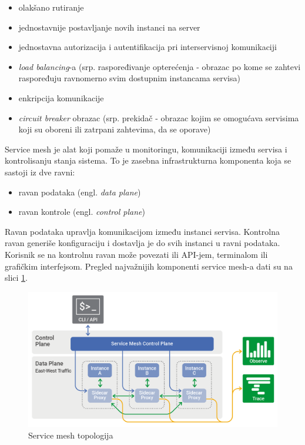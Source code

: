 \documentclass[a4paper,12pt]{report}
\begin{document}
\begin{itemize}
	\item olakšano rutiranje
	\item jednostavnije postavljanje novih instanci na server
	\item jednostavna autorizacija i autentifikacija pri interservisnoj komunikaciji
	\item \textit{load balancing}-a (srp. raspoređivanje opterećenja - obrazac po kome se zahtevi raspoređuju ravnomerno svim dostupnim instancama servisa)
	\item enkripcija komunikacije
	\item \textit{circuit breaker} obrazac (srp. prekidač - obrazac kojim se omogućava servisima koji su oboreni ili zatrpani zahtevima, da se oporave)
\end{itemize}

Service mesh je alat koji pomaže u monitoringu, komunikaciji između servisa i kontrolisanju stanja sistema. To je zasebna infrastrukturna komponenta koja se sastoji iz dve ravni: 
\begin{itemize}
	\item ravan podataka (engl. \textit{data plane})
	\item ravan kontrole (engl. \textit{control plane})
\end{itemize}

Ravan podataka upravlja komunikacijom između instanci servisa. Kontrolna ravan generiše konfiguraciju i dostavlja je do svih instanci u ravni podataka. Korisnik se na kontrolnu ravan može povezati ili API-jem, terminalom ili grafičkim interfejsom. Pregled najvažnijih komponenti service mesh-a dati su na slici  \ref{fig:service-mesh-topology}. \newline

\begin{figure}[h]
    \centering
    \includegraphics[width=\textwidth]{service-mesh-generic-topology}
    \caption{Service mesh topologija}
    \label{fig:service-mesh-topology}
\end{figure}
\end{document}
